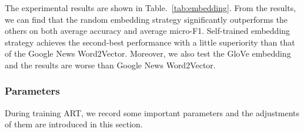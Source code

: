 The experimental results are shown in Table.~\ref{tab:embedding}. From the results, we can find that the random embedding strategy significantly outperforms the others on both average accuracy and average micro-F1. Self-trained embedding strategy achieves the second-best performance with a little superiority than that of the Google News Word2Vector. Moreover, we also test the GloVe embedding and the results are worse than Google News Word2Vector.

\begin{table}[htbp]
	\caption{Results of Different Embedding Strategies}
	\centering
	\label{tab:embedding}
\end{table}


\subsubsection{Parameters}
During training ART, we record some important parameters and the adjustments of them are introduced in this section.

